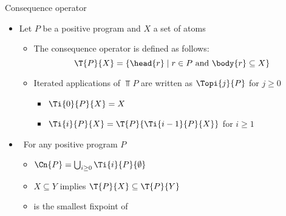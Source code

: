 \begin{frame}{Consequence operator}
  \medskip
  \begin{itemize}
  \item Let $P$ be a positive program and $X$ a set of atoms

    \begin{itemize}\normalsize
    \item<1->
      The \alert{consequence operator}  is defined as follows:
      \[
      \T{P}{X} = \{  \head{r}\mid r\in P\text{ and }\body{r}\subseteq X  \}
      \]
    \item<2->
      Iterated applications of $\Top{P}$ are written as $\Topi{j}{P}$ for
      $j\geq 0$
      \begin{itemize}\normalsize
      \item
        \(
        \Ti{0}{P}{X}=X
        \)
        \smallskip
      \item
        \(
        \Ti{i}{P}{X}=\T{P}{\Ti{i-1}{P}{X}}
        \)
        for $i\geq 1$
      \end{itemize}
    \end{itemize}
    \medskip
  \item<3->  \ For any positive program $P$
    \begin{itemize}\normalsize
    \item $\Cn{P}=\bigcup_{i\geq 0}\Ti{i}{P}{\emptyset}$
    \item $X\subseteq Y$ implies $\T{P}{X}\subseteq\T{P}{Y}$
    \item {} is the smallest fixpoint of 
    \end{itemize}
  \end{itemize}

\end{frame}
